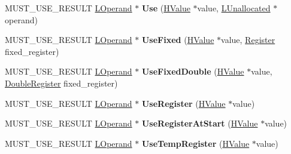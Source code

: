 \begin{DoxyCompactItemize}
\item 
M\+U\+S\+T\+\_\+\+U\+S\+E\+\_\+\+R\+E\+S\+U\+LT \hyperlink{classv8_1_1internal_1_1_l_operand}{L\+Operand} $\ast$ {\bfseries Use} (\hyperlink{classv8_1_1internal_1_1_h_value}{H\+Value} $\ast$value, \hyperlink{classv8_1_1internal_1_1_l_unallocated}{L\+Unallocated} $\ast$operand)\hypertarget{classv8_1_1internal_1_1_l_chunk_builder_accd60b3b89817c5ad33a2124e268e793}{}\label{classv8_1_1internal_1_1_l_chunk_builder_accd60b3b89817c5ad33a2124e268e793}

\item 
M\+U\+S\+T\+\_\+\+U\+S\+E\+\_\+\+R\+E\+S\+U\+LT \hyperlink{classv8_1_1internal_1_1_l_operand}{L\+Operand} $\ast$ {\bfseries Use\+Fixed} (\hyperlink{classv8_1_1internal_1_1_h_value}{H\+Value} $\ast$value, \hyperlink{structv8_1_1internal_1_1_register}{Register} fixed\+\_\+register)\hypertarget{classv8_1_1internal_1_1_l_chunk_builder_a61be80f9ab32bd10c228aad8844f63b7}{}\label{classv8_1_1internal_1_1_l_chunk_builder_a61be80f9ab32bd10c228aad8844f63b7}

\item 
M\+U\+S\+T\+\_\+\+U\+S\+E\+\_\+\+R\+E\+S\+U\+LT \hyperlink{classv8_1_1internal_1_1_l_operand}{L\+Operand} $\ast$ {\bfseries Use\+Fixed\+Double} (\hyperlink{classv8_1_1internal_1_1_h_value}{H\+Value} $\ast$value, \hyperlink{structv8_1_1internal_1_1_double_register}{Double\+Register} fixed\+\_\+register)\hypertarget{classv8_1_1internal_1_1_l_chunk_builder_a30223bb99ad69217597b53afef85c6c1}{}\label{classv8_1_1internal_1_1_l_chunk_builder_a30223bb99ad69217597b53afef85c6c1}

\item 
M\+U\+S\+T\+\_\+\+U\+S\+E\+\_\+\+R\+E\+S\+U\+LT \hyperlink{classv8_1_1internal_1_1_l_operand}{L\+Operand} $\ast$ {\bfseries Use\+Register} (\hyperlink{classv8_1_1internal_1_1_h_value}{H\+Value} $\ast$value)\hypertarget{classv8_1_1internal_1_1_l_chunk_builder_a71d4b11b7eca26df2551720af10eeb8d}{}\label{classv8_1_1internal_1_1_l_chunk_builder_a71d4b11b7eca26df2551720af10eeb8d}

\item 
M\+U\+S\+T\+\_\+\+U\+S\+E\+\_\+\+R\+E\+S\+U\+LT \hyperlink{classv8_1_1internal_1_1_l_operand}{L\+Operand} $\ast$ {\bfseries Use\+Register\+At\+Start} (\hyperlink{classv8_1_1internal_1_1_h_value}{H\+Value} $\ast$value)\hypertarget{classv8_1_1internal_1_1_l_chunk_builder_af42aa233d6d4e068d8c2f2b4fa82c4da}{}\label{classv8_1_1internal_1_1_l_chunk_builder_af42aa233d6d4e068d8c2f2b4fa82c4da}

\item 
M\+U\+S\+T\+\_\+\+U\+S\+E\+\_\+\+R\+E\+S\+U\+LT \hyperlink{classv8_1_1internal_1_1_l_operand}{L\+Operand} $\ast$ {\bfseries Use\+Temp\+Register} (\hyperlink{classv8_1_1internal_1_1_h_value}{H\+Value} $\ast$value)\hypertarget{classv8_1_1internal_1_1_l_chunk_builder_a7d84674af68312f8cb3f5926547e239f}{}\label{classv8_1_1internal_1_1_l_chunk_builder_a7d84674af68312f8cb3f5926547e239f}


\end{DoxyCompactItemize}
